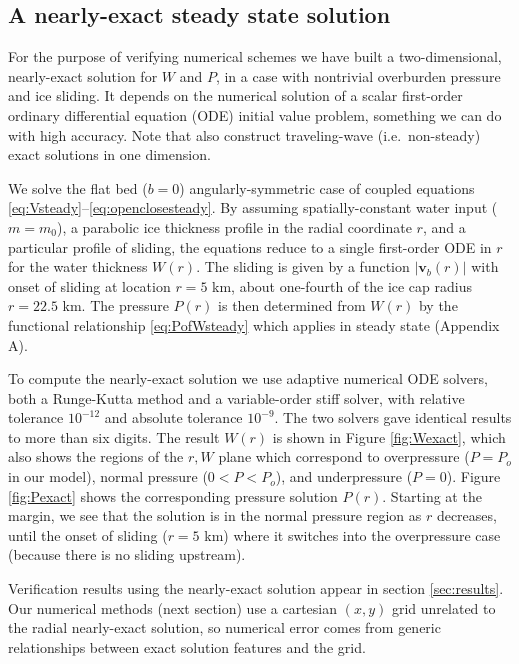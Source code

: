 \documentclass[gmd]{copernicus}   %
\begin{document}
\subsection{A nearly-exact steady state solution}  \label{subsec:exactsolution}  For the purpose of verifying numerical schemes we have built a two-dimensional, nearly-exact solution for $W$ and $P$, in a case with nontrivial overburden pressure and ice sliding.  It depends on the numerical solution of a scalar first-order ordinary differential equation (ODE) initial value problem, something we can do with high accuracy.  Note that \cite{Schoofetal2012} also construct traveling-wave (i.e.~non-steady) exact solutions in one dimension.

We solve the flat bed ($b=0$) angularly-symmetric case of coupled equations \eqref{eq:Vsteady}--\eqref{eq:openclosesteady}.  By assuming spatially-constant water input ($m=m_0$), a parabolic ice thickness profile in the radial coordinate $r$, and a particular profile of sliding, the equations reduce to a single first-order ODE in $r$ for the water thickness $W(r)$.  The sliding is given by a function $|\mathbf{v}_b(r)|$ with onset of sliding at location $r=5$ km, about one-fourth of the ice cap radius $r=22.5$ km.  The pressure $P(r)$ is then determined from $W(r)$ by the functional relationship \eqref{eq:PofWsteady} which applies in steady state (Appendix A).

To compute the nearly-exact solution we use adaptive numerical ODE solvers, both a Runge-Kutta method and a variable-order stiff solver, with relative tolerance $10^{-12}$ and absolute tolerance $10^{-9}$.  The two solvers gave identical results to more than six digits.  The result $W(r)$ is shown in Figure \ref{fig:Wexact}, which also shows the regions of the $r,W$ plane which correspond to overpressure ($P=P_o$ in our model), normal pressure ($0<P<P_o$), and underpressure ($P=0$).  Figure \ref{fig:Pexact} shows the corresponding pressure solution $P(r)$.  Starting at the margin, we see that the solution is in the normal pressure region as $r$ decreases, until the onset of sliding ($r=5$ km) where it switches into the overpressure case (because there is no sliding upstream).

Verification results using the nearly-exact solution appear in section \ref{sec:results}.  Our numerical methods (next section) use a cartesian $(x,y)$ grid unrelated to the radial nearly-exact solution, so numerical error comes from generic relationships between exact solution features and the grid.
\end{document}
